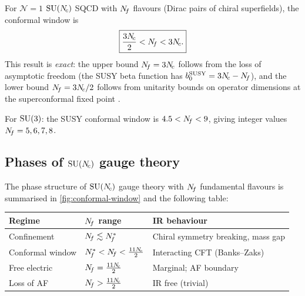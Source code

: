 \documentclass[11pt,a4paper]{article}
\begin{document}
\begin{previewbox}[title={SUSY conformal window (exact, Seiberg 1994)}]
  For $\mathcal{N}=1$ $\mathrm{SU}(N_{\!c})$ SQCD with $N_{\!f}$ flavours (Dirac pairs
  of chiral superfields), the conformal window is
  \begin{equation}
    \boxed{%
    \frac{3\Nc}{2} < \Nf < 3\Nc.
    }
    \label{eq:susy-conformal-window}
  \end{equation}
  This result is \emph{exact}: the upper bound $N_{\!f} = 3N_{\!c}$ follows from
  the loss of asymptotic freedom (the SUSY beta function has
  $b_0^{\text{SUSY}} = 3N_{\!c} - N_{\!f}$), and the lower bound
  $N_{\!f} = 3N_{\!c}/2$ follows from unitarity bounds on operator dimensions
  at the superconformal fixed point \cite{Seiberg1995}.
\end{previewbox}

For $\mathrm{SU}(3)$: the SUSY conformal window is $4.5 < N_{\!f} < 9$, giving
integer values $N_{\!f} = 5, 6, 7, 8$.

\subsection{Phases of \texorpdfstring{$\mathrm{SU}(N_{\!c})$}{SU(Nc)} gauge theory}

The phase structure of $\mathrm{SU}(N_{\!c})$ gauge theory with $N_{\!f}$ fundamental
flavours is summarised in \cref{fig:conformal-window} and the following
table:

\begin{center}
\renewcommand{\arraystretch}{1.3}
\begin{tabular}{@{}l l l@{}}
\toprule
\textbf{Regime} & \textbf{$N_{\!f}$ range} & \textbf{IR behaviour} \\
\midrule
Confinement & $N_{\!f} \lesssim N_{\!f}^*$ & Chiral symmetry breaking, mass gap \\
Conformal window & $N_{\!f}^* < N_{\!f} < \frac{11N_{\!c}}{2}$
  & Interacting CFT (Banks--Zaks) \\
Free electric & $N_{\!f} = \frac{11N_{\!c}}{2}$ & Marginal; AF boundary \\
Loss of AF & $N_{\!f} > \frac{11N_{\!c}}{2}$ & IR free (trivial) \\
\bottomrule
\end{tabular}
\end{center}
\end{document}
